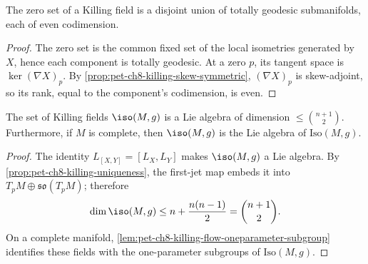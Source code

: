 \begin{theorem}
  \label{thm:pet-ch8-zero-set-totally-geodesic}

  The zero set of a Killing field is a disjoint union of totally geodesic
  submanifolds, each of even codimension.
\end{theorem}
\begin{proof}
  \sketch
  The zero set is the common fixed set of the local isometries generated by
  \(X\), hence each component is totally geodesic. At a zero \(p\), its tangent
  space is \(\ker(\nabla X)_p\). By
  \cref{prop:pet-ch8-killing-skew-symmetric}, \((\nabla X)_p\) is
  skew-adjoint, so its rank, equal to the component's codimension, is even.
\end{proof}

\begin{theorem}
  \label{thm:pet-ch8-isometry-lie-algebra-dimension}

  The set of Killing fields $\iso(M,g)$ is a Lie algebra of dimension
  $\le\binom{n+1}{2}$. Furthermore, if $M$ is complete, then $\iso(M,g)$ is the
  Lie algebra of $\mathrm{Iso}(M,g)$.
\end{theorem}
\begin{proof}
  \sketch
  The identity \(L_{[X,Y]}=[L_X,L_Y]\) makes \(\iso(M,g)\) a Lie algebra.
  By \cref{prop:pet-ch8-killing-uniqueness}, the first-jet map embeds it into
  \(T_pM\oplus\mathfrak{so}(T_pM)\); therefore
  \[
    \dim\iso(M,g)\le n+\frac{n(n-1)}2=\binom{n+1}{2}.
  \]
  On a complete manifold, \cref{lem:pet-ch8-killing-flow-oneparameter-subgroup}
  identifies these fields with the one-parameter subgroups of
  \(\mathrm{Iso}(M,g)\).
\end{proof}

